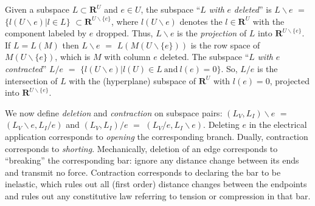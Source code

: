 \documentclass{article}
\def\Reals{\ensuremath{\mathbf R}}
\newcommand{\sminus}{\backslash}
\begin{document}
\noindent



\begin{comment}
We illustrate the oriented matroid approach by reproducing the result of
\cite{TrajWillNDR} that a particular configuration of a ``feedback structure''
with two Ebers-Moll transistors and one port
cannot exhibit negative differential resistance by itself, and it can 
exhibit NDR if one resistor is added and $\alpha_1+\alpha_2-1>0$.  
Under KVL,
the voltages across the port, resistor
and two 
Ebers-Moll diodes are given by the row space member of $M_V$ when the
three rows are multiplied by the 3 independent voltages
$V_1$, $V_2$ and the port voltage $V$.  The space of current values
feasible in the same 4 elements under KCL and the two 
Ebers-Moll linear CCCS's
is only one dimensional; it is spanned by the one
row of $M_I$.  Beginning with the signatures of the rows of the matrices,
we can apply the covector axioms to explore what common covectors are possible
under several variations.
\end{comment}



Given a subspace $L\subset\Reals^U$ and $e\in U$, the subspace 
``$L$ \textit{with} $e$ \textit{deleted}''
is
$L\sminus e$ $=$ 
$\{ l(U\sminus e) | l\in L\}$
$\subset\Reals^{U\sminus \{e\}}$, 
where $l(U\sminus e)$ denotes the $l\in\Reals^U$
with the component labeled by $e$ dropped.  
Thus, $L\sminus e$ is the \textit{projection} of $L$ into 
$\Reals^{U\sminus \{e\}}$.
If $L=L(M)$ 
then $L\sminus e$ $=$ $L(M(U\sminus \{e\}))$ is the row space of 
$M(U\sminus \{e\})$, which is $M$ with column $e$ deleted.
The subspace  ``$L$ \textit{with} $e$ \textit{contracted}'' 
$L/e$ $=$ 
$\{ l(U\sminus e) | l(U)\in L \mathrm{\ and\ } l(e)=0\}$.  
So, $L/e$ is the 
intersection of $L$ with
the (hyperplane) subspace of $\Reals^U$ with $l(e)=0$,
projected into 
$\Reals^{U\sminus \{e\}}$.

We now define \textit{deletion} and \textit{contraction} on subspace pairs:  
$(L_V, L_I)\sminus e$ $=$ $(L_V\sminus e, L_I/e)$ and 
$(L_V, L_I)/e$ $=$ $(L_V/e, L_I\sminus e)$.  
Deleting $e$ in the electrical application
corresponds to \textit{opening} the corresponding branch.
Dually, 
contraction corresponds to \textit{shorting}.  
Mechanically,
deletion of an edge corresponds to ``breaking'' the corresponding bar:
ignore any distance change between its ends and transmit no force.
Contraction corresponds to 
declaring the bar to be inelastic, which rules out 
all (first order) distance changes between the endpoints and 
rules out any constitutive law referring to 
tension or compression in that bar.
\end{document}
